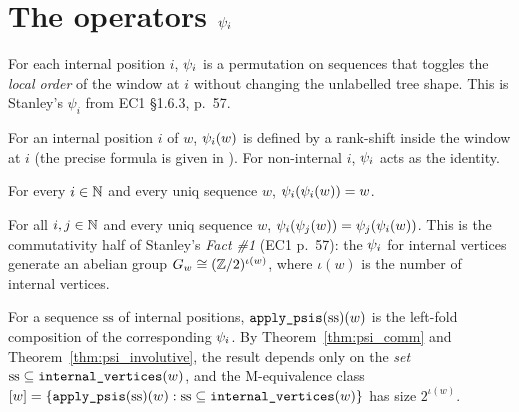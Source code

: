 \section{The operators $\psi_{i}$}

For each internal position $i$, $\psi_{i}$ is a permutation on
sequences that toggles the \emph{local order} of the window at $i$
without changing the unlabelled tree shape.  This is Stanley's
$\psi_i$ from EC1 \S1.6.3, p.~57.

\begin{definition}
  \label{def:psi}
  \rocqok
  For an internal position $i$ of $w$, $\psi_{i}(w)$ is defined by a
  rank-shift inside the window at $i$ (the precise formula is given
  in ).  For non-internal $i$, $\psi_{i}$ acts
  as the identity.
\end{definition}

\begin{theorem}
  \label{thm:psi_involutive}
  \rocqok
  For every $i \in \mathbb{N}$ and every uniq sequence $w$,
  $\psi_{i}(\psi_{i}(w)) = w$.
\end{theorem}

\begin{theorem}
  \label{thm:psi_comm}
  \rocqok
  For all $i, j \in \mathbb{N}$ and every uniq sequence $w$,
  $\psi_{i}(\psi_{j}(w)) = \psi_{j}(\psi_{i}(w))$.
  This is the commutativity half of Stanley's
  \emph{Fact \#1} (EC1 p.~57): the $\psi_{i}$ for internal vertices
  generate an abelian group $G_w \cong (\mathbb{Z}/2)^{\iota(w)}$, where
  $\iota(w)$ is the number of internal vertices.
\end{theorem}

\begin{definition}
  \label{def:apply_psis}
  \rocqok
  For a sequence $\mathrm{ss}$ of internal positions,
  $\texttt{apply\_psis}(\mathrm{ss})(w)$ is the left-fold composition of
  the corresponding $\psi_{i}$.  By
  Theorem~\ref{thm:psi_comm} and Theorem~\ref{thm:psi_involutive},
  the result depends only on the \emph{set} $\mathrm{ss} \subseteq
  \texttt{internal\_vertices}(w)$, and the M-equivalence class
  $[w] = \{\texttt{apply\_psis}(\mathrm{ss})(w) : \mathrm{ss}
  \subseteq \texttt{internal\_vertices}(w)\}$ has size $2^{\iota(w)}$.
\end{definition}

